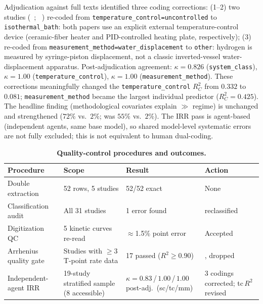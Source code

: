 Adjudication against full texts identified three coding corrections:
(1--2) two studies (\citeauthor{trowell2022}~\cite{trowell2022};
\citeauthor{martinezv2026}~\cite{martinezv2026}) re-coded from \texttt{temperature\_control=uncontrolled}
to \texttt{isothermal\_bath}: both papers use an explicit external temperature-control
device (ceramic-fiber heater and PID-controlled heating plate, respectively);
(3) \citeauthor{porciuncula2012}~\cite{porciuncula2012} re-coded from
\texttt{measurement\_method=water\_displacement} to \texttt{other}: hydrogen is measured
by syringe-piston displacement, not a classic inverted-vessel water-displacement apparatus.
Post-adjudication agreement: $\kappa\!=\!0.826$ (\texttt{system\_class}),
$\kappa\!=\!1.00$ (\texttt{temperature\_control}),
$\kappa\!=\!1.00$ (\texttt{measurement\_method}).
These corrections meaningfully changed the \texttt{temperature\_control}
$R^2_C$ from $0.332$ to $0.081$; \texttt{measurement\_method} became the
largest individual predictor ($R^2_C\!=\!0.425$). The headline finding
(methodological covariates explain $\gg$ regime) is unchanged and strengthened
($72\%$ vs.\ $2\%$; was $55\%$ vs.\ $2\%$). The IRR pass is agent-based
(independent agents, same base model), so shared model-level systematic errors
are not fully excluded; this is not equivalent to human dual-coding.

\begin{table}[tbp]
\centering
\caption{\textbf{Quality-control procedures and outcomes.}}
\label{tab:qc_summary}
\begin{tabular}{p{3.2cm}p{3.5cm}p{2.6cm}p{3.0cm}}
\hline
Procedure & Scope & Result & Action \\
\hline
Double extraction      & 52 rows, 5 studies        & 52/52 exact       & None \\
Classification audit   & All 31 studies            & 1 error found     & \citeauthor{dudoladov2016} reclassified \\
Digitization QC        & 5 kinetic curves re-read  & $\approx$1.5\% point error & Accepted \\
Arrhenius quality gate & Studies with $\ge\!3$ T-point rate data & 17 passed ($R^2\!\ge\!0.90$) & \citeauthor{rin2021}, \citeauthor{ho2016} dropped \\
Independent-agent IRR  & 19-study stratified sample (8 accessible) & $\kappa\!=\!0.83$\,/\,$1.00$\,/\,$1.00$ post-adj.\ (sc/tc/mm) & 3 codings corrected; tc\,$R^2$ revised \\
\hline
\end{tabular}
\end{table}

